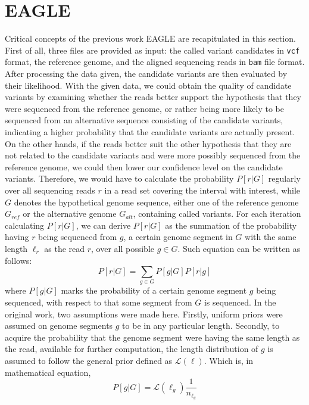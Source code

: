 \documentclass{PHlab-thesis}
\begin{document}
\section{EAGLE}
Critical concepts of the previous work EAGLE are recapitulated in this section. First of all, three files are provided as input: the called variant candidates in \texttt{vcf} format, the reference genome, and the aligned sequencing reads in \texttt{bam} file format. After processing the data given, the candidate variants are then evaluated by their likelihood. With the given data, we could obtain the quality of candidate variants by examining whether the reads better support the hypothesis that they were sequenced from the reference genome, or rather being more likely to be sequenced from an alternative sequence consisting of the candidate variants, indicating a higher probability that the candidate variants are actually present. On the other hands, if the reads better suit the other hypothesis that they are not related to the candidate variants and were more possibly sequenced from the reference genome, we could then lower our confidence level on the candidate variants. Therefore, we would have to calculate the probability $P[r|G]$ regularly over all sequencing reads $r$ in a read set covering the interval with interest, while $G$ denotes the hypothetical genome sequence, either one of the reference genome $G_{ref}$ or the alternative genome $G_{alt}$, containing called variants. For each iteration calculating $P[r|G]$, we can derive $P[r|G]$ as the summation of the probability having $r$ being sequenced from $g$, a certain genome segment in $G$ with the same length $\ell_r$ as the read $r$, over all possible ${g\in G}$. Such equation can be written as follows:
\begin{equation}
P[r|G] = \sum_{g\in G} P[g|G] P[r|g]
\end{equation}
where $P[g|G]$ marks the probability of a certain genome segment $g$ being sequenced, with respect to that some segment from $G$ is sequenced. In the original work, two assumptions were made here. Firstly, uniform priors were assumed on genome segments $g$ to be in any particular length. Secondly, to acquire the probability that the genome segment were having the same length as the read, available for further computation, the length distribution of $g$ is assumed to follow the general prior defined as $\mathcal{L}(\ell)$. Which is, in mathematical equation,
\begin{equation}
P[g|G] = \mathcal{L}(\ell_g) \frac{1}{n_{\ell_g}}
\end{equation}
\end{document}
